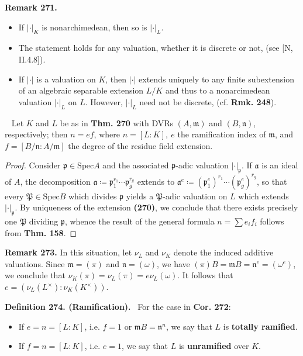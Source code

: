 \documentclass[12pt,a4paper,footinclude=true,headinclude=true]{scrbook} %
\newenvironment{corollary}[2][]
{\renewcommand\theinnercustomcol{#2}\innercustomcol[#1]
\begin{mdframed}[backgroundcolor=gray!20]\ }
{\end{mdframed}\endinnercustomcol}
\newenvironment{definition}[2][Definition]
    { \begin{mdframed}[backgroundcolor=gray!20] \textbf{#1 #2.}\ }
    {  \end{mdframed}}
\newenvironment{remark}[2][Remark]
    { \begin{mdframed}[backgroundcolor=gray!20] \textbf{#1 #2.} }
    {  \end{mdframed}}
\begin{document}
\begin{remark}{271}
    \begin{itemize}
        \item[(a)] If $|\cdot|_K$ is nonarchimedean, then so is $|\cdot|_L$.
        \item[(b)] The statement holds for any valuation, whether it is discrete or not, (see [N, II.4.8]).
        \item[(c)] If $|\cdot|$ is a valuation on $K$, then $|\cdot|$ extends uniquely to any finite subextension of an algebraic separable extension $L/K$ and thus to a nonarcimedean valuation $|\cdot|_L$ on $L$. However, $|\cdot|_L$ need not be discrete, (cf. \textbf{Rmk. 248}).
    \end{itemize}
\end{remark}

\begin{corollary}{272}
    Let $K$ and $L$ be as in \textbf{Thm. 270} with DVRs $(A,\mathfrak{m})$ and $(B,\mathfrak{n})$, respectively; then $n=ef$, where $n=[L:K],\ e$ the ramification index of $\mathfrak{m}$, and $f=[B/\mathfrak{n}:A/\mathfrak{m}]$ the degree of the residue field extension.
\end{corollary}
\begin{proof}
    Consider $\mathfrak{p}\in\mathrm{Spec}A$ and the associated $\mathfrak{p}$-adic valuation $|\cdot|_\mathfrak{p}$. If $\mathfrak{a}$ is an ideal of $A$, the decomposition $\mathfrak{a}\coloneqq\mathfrak{p}_1^{r_1}\cdots\mathfrak{p}_g^{r_g}$ extends to $\mathfrak{a}^e\coloneqq(\mathfrak{p}_1^e)^{r_1}\cdots(\mathfrak{p}_g^e)^{r_g}$, so that every $\mathfrak{P}\in\mathrm{Spec}B$ which divides $\mathfrak{p}$ yields a $\mathfrak{P}$-adic valuation on $L$ which extends $|\cdot|_\mathfrak{p}$. By uniqueness of the extension \textbf{(270)}, we conclude that there exists precisely one $\mathfrak{P}$ dividing $\mathfrak{p}$, whence the result of the general formula $n=\sum e_if_i$ follows from \textbf{Thm. 158}.
\end{proof}

\begin{remark}{273}
    In this situation, let $\nu_L$ and $\nu_K$ denote the induced additive valuations. Since $\mathfrak{m}=(\pi)$ and $\mathfrak{n}=(\omega)$, we have $(\pi)B=\mathfrak{m}B=\mathfrak{n}^e=(\omega^e)$, we conclude that $\nu_K(\pi)=\nu_L(\pi)=e\nu_L(\omega)$. It follows that $e=(\nu_L(L^\times):\nu_K(K^\times))$.
\end{remark}

\begin{definition}{274. (Ramification)} 
    For the case in \textbf{Cor. 272}:
    \begin{itemize}
        \item If $e=n=[L:K]$, i.e. $f=1$ or $\mathfrak{m}B=\mathfrak{n}^n$, we say that $L$ is \textbf{totally ramified}.
        \item If $f=n=[L:K]$, i.e. $e=1$, we say that $L$ is \textbf{unramified} over $K$.
    \end{itemize}
\end{definition}
\end{document}
